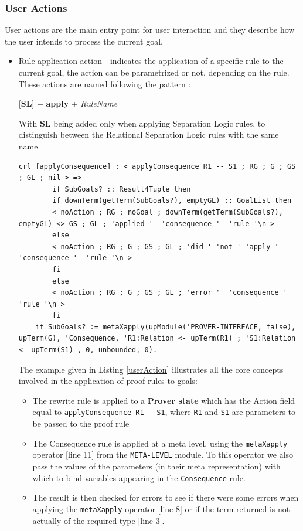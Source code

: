 \documentclass[12pt,a4paper]{article}
\begin{document}
{\subsubsection{User Actions}
User actions are the main entry point for user interaction and they describe how the user intends to process the current goal.
\begin{itemize}
	\item {Rule application action - indicates the application of a specific rule to the current goal, the action can be parametrized or not, depending on the rule. These actions are named following the pattern :	
	\begin{center}
		[\textbf{SL}] + \textbf{apply} + \textit{RuleName}
	\end{center}
		With \textbf{SL} being added only when applying Separation Logic rules, to distinguish between the Relational Separation Logic rules with the same name.
	}
		\begin{lstlisting}[label=userAction,caption=Rule Application Action]
	crl [applyConsequence] : < applyConsequence R1 -- S1 ; RG ; G ; GS ; GL ; nil > =>
		if SubGoals? :: Result4Tuple then 
		if downTerm(getTerm(SubGoals?), emptyGL) :: GoalList then
		< noAction ; RG ; noGoal ; downTerm(getTerm(SubGoals?), emptyGL) <> GS ; GL ; 'applied '  'consequence '  'rule '\n > 
		else
		< noAction ; RG ; G ; GS ; GL ; 'did ' 'not ' 'apply ' 'consequence '  'rule '\n > 
		fi
		else 
		< noAction ; RG ; G ; GS ; GL ; 'error '  'consequence '  'rule '\n > 
		fi 
	if SubGoals? := metaXapply(upModule('PROVER-INTERFACE, false), upTerm(G), 'Consequence, 'R1:Relation <- upTerm(R1) ; 'S1:Relation <- upTerm(S1) , 0, unbounded, 0).
		\end{lstlisting}
		The example given in Listing \ref{userAction} illustrates all the core concepts involved in the application of proof rules to goals: 
		\begin{itemize}
			\item The rewrite rule is applied to a \textbf{Prover state} which has the Action field equal to \texttt{applyConsequence R1 -- S1}, where \texttt{R1} and \texttt{S1} are parameters to be passed to the proof rule
			\item The Consequence rule is applied at a meta level, using the \texttt{metaXapply} operator [line 11] from the \texttt{META-LEVEL} module. To this operator we also pass the values of the parameters (in their meta representation) with which to bind variables appearing in the \texttt{Consequence} rule.
			\item The result is then checked for errors to see if there were some errors when applying the \texttt{metaXapply} operator [line 8] or if the term returned is not actually of the required type [line 3].

\end{itemize}
\end{itemize}}
\end{document}
